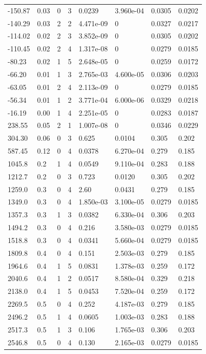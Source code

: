 \documentclass[preview]{standalone}
\begin{document}
{{\begin{tabular}{L{1.2cm}C{1.2cm} C{0.3cm}C{0.5cm} C{1.4cm}C{1.4cm} C{1.4cm}C{1.4cm}}
  -150.87  &  0.03  & 0     &  3 &  0.0239  & 3.960e-04  & 0.0305 &  0.0202   \\ 
  -140.29  &  0.03  & 2     &  2 &  4.471e-09  & 0  & 0.0327 &  0.0217   \\ 
  -114.02  &  0.02  & 2     &  3 &  3.852e-09  & 0  & 0.0305 &  0.0202   \\ 
  -110.45  &  0.02  & 2     &  4 &  1.317e-08  & 0  & 0.0279 &  0.0185   \\ 
  -80.23  &  0.02  & 1     &  5 &  2.648e-05  & 0  & 0.0259 &  0.0172   \\ 
  -66.20  &  0.01  & 1     &  3 &  2.765e-03  & 4.600e-05  & 0.0306 &  0.0203   \\ 
  -63.05  &  0.01  & 2     &  4 &  2.113e-09  & 0  & 0.0279 &  0.0185   \\ 
  -56.34  &  0.01  & 1     &  2 &  3.771e-04  & 6.000e-06  & 0.0329 &  0.0218   \\ 
  -16.19  &  0.00  & 1     &  4 &  2.251e-05  & 0  & 0.0283 &  0.0187   \\ 
  238.55  &  0.05  & 2     &  1 &  1.007e-08  & 0  & 0.0346 &  0.0229   \\ 
  304.30  &  0.06  & 0     &  3 &  0.625  & 0.0104  & 0.305 &  0.202   \\ 
  587.45  &  0.12  & 0     &  4 &  0.0378  & 6.270e-04  & 0.279 &  0.185   \\ 
  1045.8  &   0.2  & 1     &  4 &  0.0549  & 9.110e-04  & 0.283 &  0.188   \\ 
  1212.7  &   0.2  & 0     &  3 &  0.723  & 0.0120  & 0.305 &  0.202   \\ 
  1259.0  &   0.3  & 0     &  4 &  2.60  & 0.0431  & 0.279 &  0.185   \\ 
  1349.0  &   0.3  & 0     &  4 &  1.850e-03  & 3.100e-05  & 0.0279 &  0.0185   \\ 
  1357.3  &   0.3  & 1     &  3 &  0.0382  & 6.330e-04  & 0.306 &  0.203   \\ 
  1494.2  &   0.3  & 0     &  4 &  0.216  & 3.580e-03  & 0.0279 &  0.0185   \\ 
  1518.8  &   0.3  & 0     &  4 &  0.0341  & 5.660e-04  & 0.0279 &  0.0185   \\ 
  1809.8  &   0.4  & 0     &  4 &  0.151  & 2.503e-03  & 0.279 &  0.185   \\ 
  1964.6  &   0.4  & 1     &  5 &  0.0831  & 1.378e-03  & 0.259 &  0.172   \\ 
  2040.6  &   0.4  & 1     &  2 &  0.0517  & 8.580e-04  & 0.329 &  0.218   \\ 
  2138.0  &   0.4  & 1     &  5 &  0.0453  & 7.520e-04  & 0.259 &  0.172   \\ 
  2269.5  &   0.5  & 0     &  4 &  0.252  & 4.187e-03  & 0.279 &  0.185   \\ 
  2496.2  &   0.5  & 1     &  4 &  0.0605  & 1.003e-03  & 0.283 &  0.188   \\ 
  2517.3  &   0.5  & 1     &  3 &  0.106  & 1.765e-03  & 0.306 &  0.203   \\ 
  2546.8  &   0.5  & 0     &  4 &  0.130  & 2.165e-03  & 0.0279 &  0.0185   \\ 
\hline 
\end{tabular} 

}}
\end{document}
